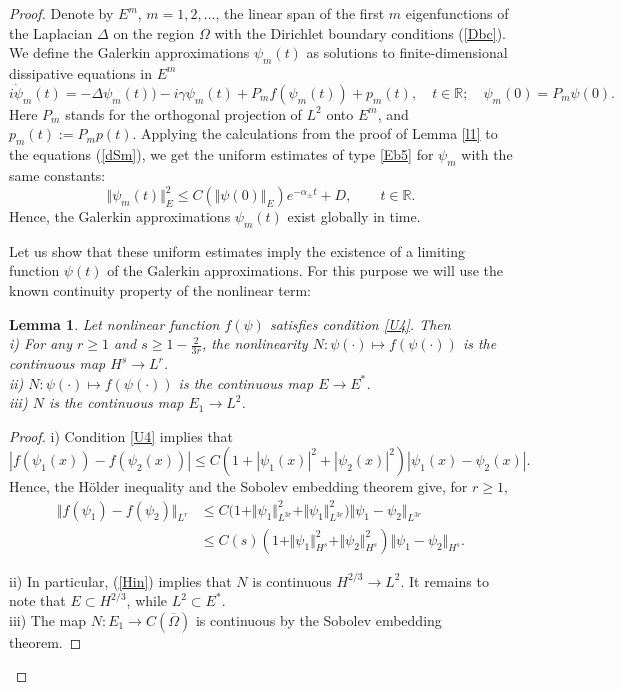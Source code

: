 \documentclass[11pt]{article}
\newtheorem{lemma}[theorem]{Lemma}
\newcommand{\R}{{\mathbb R}}
\newcommand{\al}{\alpha}
\newcommand{\De}{\Delta}
\newcommand{\ga}{\gamma}
\newcommand{\Om}{\Omega}
\newcommand{\ov}{\overline}
\newcommand{\5}{{\hspace{0.5mm}}}
\newcommand{\ds}{\displaystyle}
\numberwithin{equation}{section}
\newcommand{\la}{\label}
\newcommand{\be}{\begin{equation}}
\newcommand{\ee}{\end{equation}}
\newcommand{\bl}{\begin{lemma}}
\newcommand{\el}{\end{lemma}}
\numberwithin{equation}{section}
\begin{document}
\begin{proof}
Denote by $E^m$, $m=1,2,...$, the linear span of the first $m$ eigenfunctions of the
 Laplacian $\De$ on the region $\Om$ with the Dirichlet boundary conditions (\ref{Dbc}).
 We define the Galerkin approximations $\psi_m(t)$ as solutions to finite-dimensional dissipative equations in $E^m$
 \be\la{dSm}
i\dot\psi_m(t)=-\De\psi_m(t))-i\ga \psi_m(t)+P_m f(\psi_m(t))+p_m( t),\quad t\in\R; \quad \psi_m(0)=P_m\psi(0).
\ee
Here $P_m$ stands for the orthogonal projection of $L^2$ onto $E^m$, and $p_m( t):=P_m p( t)$.
Applying the calculations from the proof of Lemma \ref{l1} to the equations (\ref{dSm}),
we get the uniform estimates of type \eqref{Eb5} for $\psi_m$ with the same constants:
\be\la{Eb5m}
\Vert\psi_m(t) \Vert_E^2 \le C(\Vert\psi(0)\Vert_E)e^{-\al_\pm t}+D,\qquad t\in\R.
\ee
Hence, the Galerkin approximations $\psi_m(t)$ exist globally in time.
\smallskip

Let us show that these uniform estimates imply the existence of a limiting function $\psi(t)$ of the
Galerkin approximations.
For this purpose we will use the known continuity property of the nonlinear term:
\bl\la{lnl}
Let nonlinear function $f(\psi)$ satisfies condition \eqref{U4}. Then\\
{\rm i)}
For any $r\ge 1$ and $s\ge 1-\ds\frac{2}{3r}$,
the nonlinearity $N:\psi(\cdot)\mapsto f(\psi(\cdot))$ is the continuous map $H^s\to L^r$.
\smallskip\\
{\rm ii)} $N:\psi(\cdot)\mapsto f(\psi(\cdot))$ is the continuous map $E\to E^*$.
\smallskip\\
{\rm iii)} $N$ is the continuous map $E_1\to L^2$.

\el
\begin{proof}
i) Condition \eqref{U4} implies that
$$
|f(\psi_1(x))-f(\psi_2(x))|\le C(1+|\psi_1(x)|^{2}+|\psi_2(x)|^{2})|\psi_1(x)-\psi_2(x)|.
$$
Hence, the H\"older inequality and the Sobolev embedding theorem give, for $r\ge 1$, 
\begin{align}\nonumber
\Vert f(\psi_1)-f(\psi_2)\Vert_{L^r} &\le C\Big(1+\Vert\psi_1\Vert_{L^{3r}}^{2}+\Vert\psi_1\Vert_{L^{3r}}^{2})\Vert\psi_1-\psi_2\Vert_{L^{3r}}
\\
\la{Hin}
&\le C(s)(1+\Vert\psi_1\Vert_{H^s}^{2}+\Vert\psi_2\Vert_{H^s}^{2}) \Vert\psi_1-\psi_2\Vert_{H^s}.
\end{align}

ii) In particular, (\ref{Hin}) implies that $N$ is continuous $H^{2/3}\to L^2$.
It remains to note that $E\subset H^{2/3}$, while $L^2\subset E^*$.
\smallskip\\
iii) The map
$N:E_1\to C(\ov\Om)$ is continuous by the Sobolev embedding theorem.
\end{proof}


\end{proof}
\end{document}
